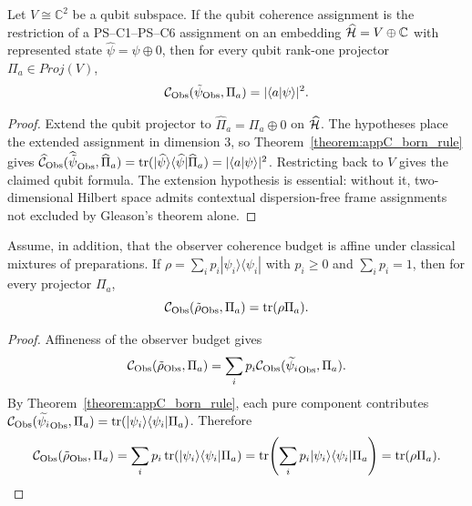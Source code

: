 \begin{corollary}[Qubit case \texorpdfstring{$d = 2$}{d = 2}]
\label{corollary:appC_qubit_case}
Let $V\cong\mathbb{C}^2$ be a qubit subspace. If the qubit coherence assignment is
the restriction of a PS--C1--PS--C6 assignment on an embedding
$\widehat{\mathcal{H}}=V\oplus\mathbb{C}$ with represented state
$\widehat\psi=\psi\oplus0$, then for every qubit rank-one projector
$\Pi_a\in Proj(V)$,
\[
\mathcal{C}_{\mathrm{Obs}}(\tilde\psi_{\mathrm{Obs}},\Pi_a)=|\langle a|\psi\rangle|^2.
\]
\end{corollary}

\begin{proof}
\label{proof:appC_qubit_case}
Extend the qubit projector to $\widehat\Pi_a=\Pi_a\oplus0$ on
$\widehat{\mathcal{H}}$. The hypotheses place the extended assignment in dimension
$3$, so Theorem~\ref{theorem:appC_born_rule} gives
$\widehat{\mathcal C}_{\mathrm{Obs}}(\widehat{\tilde\psi}_{\mathrm{Obs}},\widehat\Pi_a)
=\operatorname{tr}(|\widehat\psi\rangle\langle\widehat\psi|\widehat\Pi_a)
=|\langle a|\psi\rangle|^2$. Restricting back to $V$ gives the claimed qubit
formula. The extension hypothesis is essential: without it, two-dimensional
Hilbert space admits contextual dispersion-free frame assignments not excluded by
Gleason's theorem alone.
\end{proof}

\begin{corollary}
\label{corollary:appC_mixed_states}
Assume, in addition, that the observer coherence budget is affine under classical
mixtures of preparations. If
$\rho = \sum_i p_i |\psi_i\rangle\langle\psi_i|$ with $p_i\ge0$ and
$\sum_i p_i=1$, then for every projector $\Pi_a$,
\[
\mathcal{C}_{\mathrm{Obs}}(\tilde\rho_{\mathrm{Obs}}, \Pi_a) = \operatorname{tr}(\rho \Pi_a).
\]
\end{corollary}

\begin{proof}
\label{proof:appC_mixed_states}
Affineness of the observer budget gives
\[
\mathcal{C}_{\mathrm{Obs}}(\tilde\rho_{\mathrm{Obs}},\Pi_a)
=\sum_i p_i\mathcal{C}_{\mathrm{Obs}}(\widetilde{\psi_i}_{\mathrm{Obs}},\Pi_a).
\]
By Theorem~\ref{theorem:appC_born_rule}, each pure component contributes
$\mathcal{C}_{\mathrm{Obs}}(\widetilde{\psi_i}_{\mathrm{Obs}},\Pi_a)
=\operatorname{tr}(|\psi_i\rangle\langle\psi_i|\Pi_a)$. Therefore
\[
\mathcal{C}_{\mathrm{Obs}}(\tilde\rho_{\mathrm{Obs}},\Pi_a)
=\sum_i p_i\operatorname{tr}(|\psi_i\rangle\langle\psi_i|\Pi_a)
=\operatorname{tr}\!\left(\sum_i p_i|\psi_i\rangle\langle\psi_i|\Pi_a\right)
=\operatorname{tr}(\rho\Pi_a).
\]
\end{proof}

